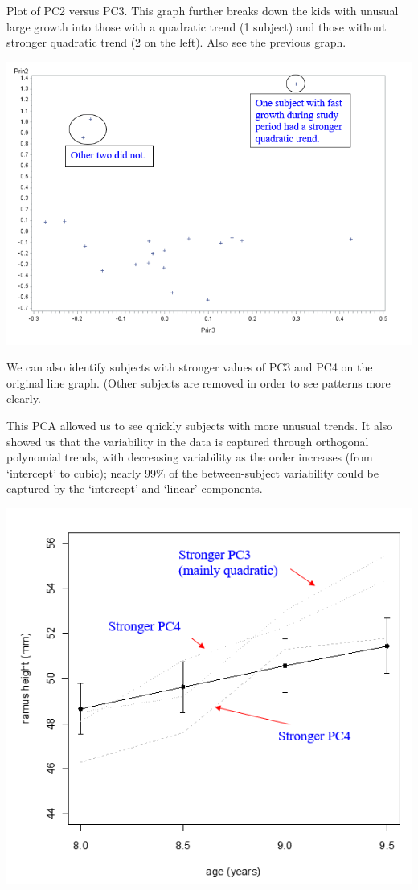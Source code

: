\documentclass[
  9pt,
  ignorenonframetext,
]{beamer}
\begin{document}
\begin{frame}{}
\protect\hypertarget{section-16}{}
Plot of PC2 versus PC3. This graph further breaks down the kids with
unusual large growth into those with a quadratic trend (1 subject) and
those without stronger quadratic trend (2 on the left). Also see the
previous graph.

\tiny

\begin{center}\includegraphics[width=0.6\linewidth]{figs_L2/f24} \end{center}

\tiny
\end{frame}

\begin{frame}{}
\protect\hypertarget{section-17}{}
We can also identify subjects with stronger values of PC3 and PC4 on the
original line graph. (Other subjects are removed in order to see
patterns more clearly.

This PCA allowed us to see quickly subjects with more unusual trends. It
also showed us that the variability in the data is captured through
orthogonal polynomial trends, with decreasing variability as the order
increases (from `intercept' to cubic); nearly 99\% of the
between-subject variability could be captured by the `intercept' and
`linear' components.

\tiny

\begin{center}\includegraphics[width=0.6\linewidth]{figs_L2/f25} \end{center}

\tiny
\end{frame}
\end{document}
